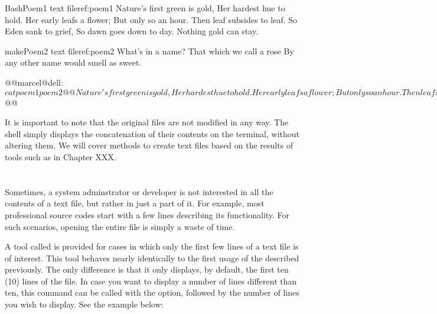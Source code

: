 \begin{command_line_float}{Bash}{Poem1 text file}{ref:poem1}
Nature's first green is gold,
Her hardest hue to hold.
Her early leafs a flower;
But only so an hour.
Then leaf subsides to leaf.
So Eden sank to grief,
So dawn goes down to day.
Nothing gold can stay.
\end{command_line_float}

\begin{command_line_float}{make}{Poem2 text file}{ref:poem2}
What's in a name? That which we call a rose
By any other name would smell as sweet.
\end{command_line_float}


\begin{command_line}[make]
@@marcel@dell:~$ cat poem1 poem2@@
Nature's first green is gold,
Her hardest hue to hold.
Her early leafs a flower;
But only so an hour.
Then leaf subsides to leaf.
So Eden sank to grief,
So dawn goes down to day.
Nothing gold can stay.
What's in a name? That which we call a rose
By any other name would smell as sweet.
@@marcel@dell:~$ @@
\end{command_line}

It is important to note that the original files are not modified in any way. The shell simply displays the concatenation of their contents on the terminal, without altering them. We will cover methods to create text files based on the results of tools such as  in Chapter XXX.

\section{}
 Sometimes, a system adminstrator or developer is not interested in all the contents of a text file, but rather in just a part of it. For example, most professional source codes start with a few lines describing its functionality. For such scenarios, opening the entire file is simply a waste of time.

 A tool called  is provided for cases in which only the first few lines of a text file is of interest. This tool behaves nearly identically to the first usage of the  described previously. The only difference is that it only displays, by default, the first ten (10) lines of the file. In case you want to display a number of lines different than ten, this command can be called with the  option, followed by the number of lines you wish to display. See the example below:

